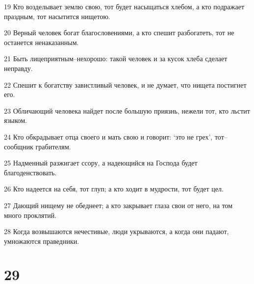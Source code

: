 \par 19 Кто возделывает землю свою, тот будет насыщаться хлебом, а кто подражает праздным, тот насытится нищетою.
\par 20 Верный человек богат благословениями, а кто спешит разбогатеть, тот не останется ненаказанным.
\par 21 Быть лицеприятным--нехорошо: такой человек и за кусок хлеба сделает неправду.
\par 22 Спешит к богатству завистливый человек, и не думает, что нищета постигнет его.
\par 23 Обличающий человека найдет после большую приязнь, нежели тот, кто льстит языком.
\par 24 Кто обкрадывает отца своего и мать свою и говорит: `это не грех', тот--сообщник грабителям.
\par 25 Надменный разжигает ссору, а надеющийся на Господа будет благоденствовать.
\par 26 Кто надеется на себя, тот глуп; а кто ходит в мудрости, тот будет цел.
\par 27 Дающий нищему не обеднеет; а кто закрывает глаза свои от него, на том много проклятий.
\par 28 Когда возвышаются нечестивые, люди укрываются, а когда они падают, умножаются праведники.

\chapter{29}

